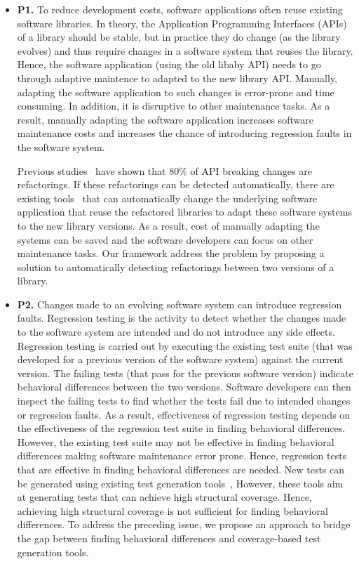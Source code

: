 \begin{itemize}
\item \textbf{P1.} To reduce development costs, software applications often reuse existing software libraries. 
In theory, the Application Programming Interfaces (APIs) of a library should be stable, but in practice they do change (as the library evolves) and thus require changes in a software system that reuses the library. 
Hence, the software application (using the old libaby API) needs to go through adaptive maintence to adapted to the new library API. 
Manually, adapting the software application to such changes is error-prone and time consuming. In addition, it is disruptive to other maintenance tasks.
As a result, manually adapting the software application increases software maintenance costs and increases the chance of introducing regression faults in the software system. 

Previous studies~\cite{Dig:2006} have shown that 80\% of API breaking changes are refactorings. If these refactorings can be detected automatically, there are existing tools~\cite{Henkel05} that can automatically change the underlying software application that reuse the refactored libraries to adapt these software systems to the new library versions. As a result, cost of manually adapting the systems can be saved and the software developers can focus on other maintenance tasks. Our framework address the problem by proposing a solution to automatically detecting refactorings between two versions of a library.


\item \textbf{P2.} 
Changes made to an evolving software system can introduce regression faults. 
Regression testing is the activity to detect whether the changes made to the software system are intended and do not 
introduce any side effects. 
Regression testing is carried out by executing the existing test suite (that was developed for a previous version of the software system)
against the current version. The failing tests (that pass for the previous software version) indicate behavioral differences between the two versions. 
Software developers can then inspect the failing tests to find whether the tests fail due to intended changes or regression faults.
As a result, effectiveness of regression testing depends on the effectiveness of the regression test suite in finding behavioral differences.  
However, the existing test suite may not be effective in finding behavioral differences making software maintenance error prone.
Hence, regression tests that are effective in finding behavioral differences are needed. New tests can be generated using existing test generation 
tools~\cite{cute, dart, king:symex, exe, Clarke:symbolic,JPF-symbolic, godefroid:fuzz, eTOC, inkumsah08:improving}, However, these tools aim at generating tests that can achieve high structural coverage. Hence, achieving high structural coverage is not sufficient for finding behavioral differences. To address the preceding issue, we propose an approach to bridge the gap between finding behavioral differences and coverage-based test generation tools.


\end{itemize}
